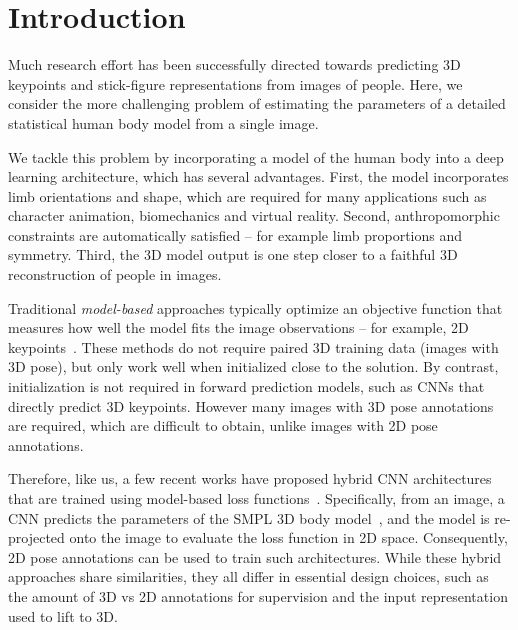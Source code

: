 \documentclass[10pt,twocolumn,letterpaper]{article}
\begin{document}
\vspace{-1em}

\section{Introduction}

Much research effort has been successfully directed towards predicting 
3D keypoints and stick-figure representations from images of people. 
Here, we consider the more challenging problem of estimating the parameters 
of a detailed statistical human body model from a single image. 

We tackle this problem by incorporating a model of the human body into 
a deep learning architecture, which has several advantages. First, the model 
incorporates limb orientations and shape, which are required for many 
applications such as character animation, biomechanics and virtual 
reality. Second, anthropomorphic constraints are automatically satisfied -- for example 
limb proportions and symmetry. Third, the 3D model output is one step closer to 
a faithful 3D reconstruction of people in images. 

Traditional \emph{model-based} approaches typically optimize an objective function that 
measures how well the model fits the image observations -- for example, 2D 
keypoints~\cite{bogo_smpl_eccv16,Lassner:UP:2017}. These methods do not require 
paired 3D training data (images with 3D pose), but only work well when 
initialized close to the solution. By contrast, initialization is not required 
in forward prediction models, such as CNNs that directly predict 3D keypoints.
However many  images with 3D pose annotations are required, which are difficult to 
obtain, unlike images with 2D pose annotations. 

Therefore, like us, a few recent works have proposed hybrid CNN architectures 
that are trained using model-based loss functions~\cite{tan2017indirect,tung2017self,hmrKanazawa17,pavlakos2018humanshape}.
Specifically, from an image, a CNN predicts the parameters of the SMPL 3D 
body model~\cite{smpl2015loper}, and the model is re-projected onto the 
image to evaluate the loss function in 2D space. Consequently, 2D pose 
annotations can be used to train such architectures. While these hybrid approaches 
share similarities, they all differ in essential design choices, such as the amount 
of 3D vs 2D annotations for supervision and the input representation used to lift to 3D.
\end{document}
